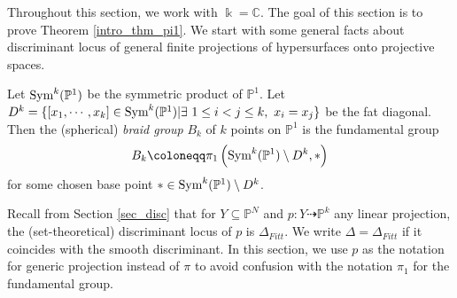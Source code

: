 \documentclass[12pt]{amsart}
\newcommand{\C}{\mathbb{C}} %
\newcommand{\Sym}{\textup{Sym}}
\DeclareMathOperator{\Sing}{Sing}%
\begin{document}
Throughout this section, we work with $\Bbbk=\C$. The goal of this section is to prove Theorem \ref{intro_thm_pi1}. We start with some general facts about discriminant locus of general finite projections of hypersurfaces onto projective spaces.

Let $\Sym^k (\mathbb{P}^1)$ be the symmetric product of $\mathbb P^1$. Let $D^k =\{[x_1,\dotsb, x_k]\in\Sym^k (\mathbb{P}^1)\vert\exists\ 1\leq i<j\leq k,\ x_i=x_j\}$ be the fat diagonal. Then the (spherical) \emph{braid group} $B_k$ of $k$ points on $\mathbb{P}^1$ is the fundamental group $$B_k\coloneqq\pi_1\left(\Sym^k (\mathbb{P}^1)\setminus D^k,\ast\right)$$ for some chosen base point $\ast\in \Sym^k (\mathbb{P}^1)\setminus D^k$.\par


Recall from Section \ref{sec_disc} that for $Y\subseteq\mathbb{P}^N$ and $p\colon Y\dashrightarrow \mathbb{P}^k$ any linear projection, the  (set-theoretical) discriminant locus of $p$ is $\Delta_{Fitt}$. We write $\Delta=\Delta_{Fitt}$ if it coincides with the smooth discriminant. In this section, we use $p$ as the notation for generic projection instead of $\pi$ to avoid confusion with the notation $\pi_1$ for the fundamental group.%
\end{document}

